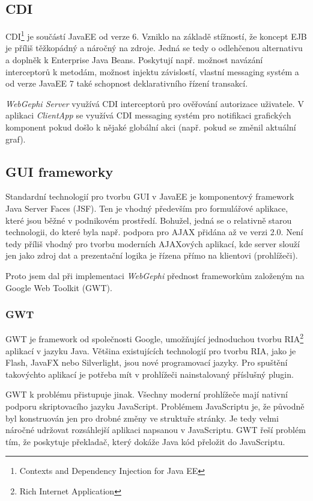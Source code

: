\documentclass[thesis=M,czech]{FITthesis}[2014/05/6]
\begin{document}
\subsection{CDI}
CDI\footnote{Contexts and Dependency Injection for Java EE\cite{cdi}} je součástí JavaEE od verze 6. Vzniklo na základě stížností, že koncept EJB je příliš těžkopádný a náročný na zdroje. Jedná se tedy o odlehčenou alternativu a doplněk k Enterprise Java Beans.
Poskytují např. možnost navázání interceptorů k metodám, možnost injektu závislostí, vlastní messaging systém a od verze JavaEE 7 také schopnost deklarativního řízení transakcí.

\textit{WebGephi Server} využívá CDI interceptorů pro ověřování autorizace uživatele. V aplikaci \textit{ClientApp} se využívá CDI messaging systém pro notifikaci grafických komponent pokud 
došlo k nějaké globální akci (např. pokud se změnil aktuální graf).

\subsection{GUI frameworky}
Standardní technologií pro tvorbu GUI v JavaEE je komponentový framework Java Server Faces (JSF). Ten je vhodný především pro formulářové aplikace, které jsou běžné
v podnikovém prostředí. Bohužel, jedná se o relativně starou technologii, do které byla např. podpora pro AJAX přidána až ve verzi 2.0. 
Není tedy příliš vhodný pro tvorbu moderních AJAXových aplikací, kde server slouží jen jako zdroj dat a prezentační logika je řízena přímo na klientovi (prohlížeči).

Proto jsem dal při implementaci \textit{WebGephi} přednost frameworkům založeným na Google Web Toolkit (GWT)\cite{gwt}\cite{gwt-in-action}.

\subsubsection{GWT}
GWT je framework od společnosti Google, umožňující jednoduchou tvorbu RIA\footnote{Rich Internet Application} aplikací v jazyku Java. 
Většina existujících technologií pro tvorbu RIA, jako je Flash, JavaFX nebo Silverlight, jsou nové programovací jazyky. 
Pro spuštění takovýchto aplikací je potřeba mít v prohlížeči nainstalovaný příslušný plugin.

GWT k problému přistupuje jinak. Všechny moderní prohlížeče mají nativní podporu skriptovacího jazyku JavaScript.
 Problémem JavaScriptu je, že původně byl konstruován jen pro drobné změny ve struktuře stránky. Je tedy velmi náročné udržovat 
 rozsáhlejší aplikaci napsanou v JavaScriptu. GWT řeší problém tím, že poskytuje překladač, který dokáže Java kód přeložit do JavaScriptu.
\end{document}
